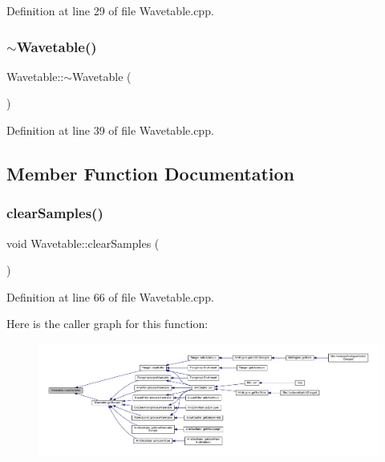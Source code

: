Definition at line 29 of file Wavetable.\+cpp.

\mbox{\label{class_wavetable_abcb5f277ac5644c679f9b77b0786d813}} 
\subsubsection{\texorpdfstring{$\sim$\+Wavetable()}{~Wavetable()}}
{\footnotesize\ttfamily Wavetable\+::$\sim$\+Wavetable (\begin{DoxyParamCaption}{ }\end{DoxyParamCaption})}



Definition at line 39 of file Wavetable.\+cpp.



\subsection{Member Function Documentation}
\mbox{\label{class_wavetable_ae4815729b57d8625a17ae0421b394217}} 
\subsubsection{\texorpdfstring{clear\+Samples()}{clearSamples()}}
{\footnotesize\ttfamily void Wavetable\+::clear\+Samples (\begin{DoxyParamCaption}{ }\end{DoxyParamCaption})}



Definition at line 66 of file Wavetable.\+cpp.

Here is the caller graph for this function\+:
\nopagebreak
\begin{figure}[H]
\begin{center}
\leavevmode
\includegraphics[width=350pt]{class_wavetable_ae4815729b57d8625a17ae0421b394217_icgraph}
\end{center}
\end{figure}
\mbox{\label{class_wavetable_a2ed27fd46eac11bd828c7111fca7bc0b}} 
